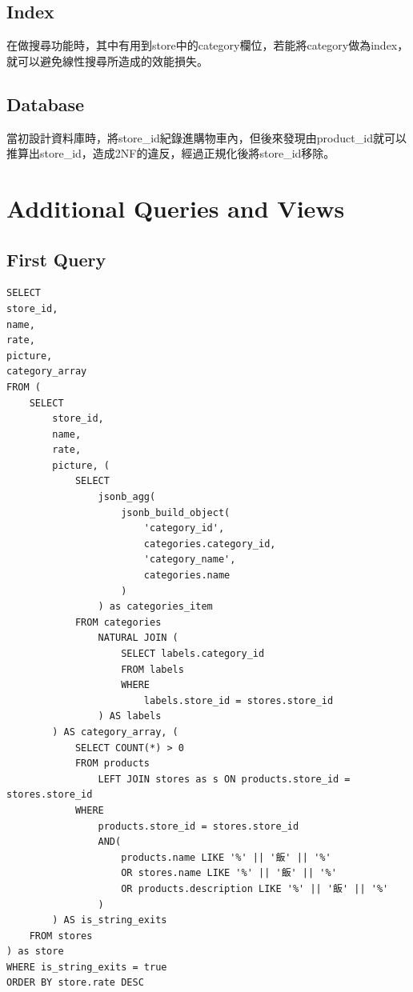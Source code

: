\documentclass[a4paper, 12pt]{article}
\begin{document}
\subsection{Index}
    在做搜尋功能時，其中有用到store中的category欄位，若能將category做為index，就可以避免線性搜尋所造成的效能損失。
\subsection{Database}
    當初設計資料庫時，將store\_id紀錄進購物車內，但後來發現由product\_id就可以推算出store\_id，造成2NF的違反，經過正規化後將store\_id移除。

\newpage

\section{Additional Queries and Views}

\subsection{First Query}

\begin{lstlisting}
SELECT
store_id,
name,
rate,
picture,
category_array
FROM (
    SELECT
        store_id,
        name,
        rate,
        picture, (
            SELECT
                jsonb_agg(
                    jsonb_build_object(
                        'category_id',
                        categories.category_id,
                        'category_name',
                        categories.name
                    )
                ) as categories_item
            FROM categories
                NATURAL JOIN (
                    SELECT labels.category_id
                    FROM labels
                    WHERE
                        labels.store_id = stores.store_id
                ) AS labels
        ) AS category_array, (
            SELECT COUNT(*) > 0
            FROM products
                LEFT JOIN stores as s ON products.store_id = stores.store_id
            WHERE
                products.store_id = stores.store_id
                AND(
                    products.name LIKE '%' || '飯' || '%'
                    OR stores.name LIKE '%' || '飯' || '%'
                    OR products.description LIKE '%' || '飯' || '%'
                )
        ) AS is_string_exits
    FROM stores
) as store
WHERE is_string_exits = true
ORDER BY store.rate DESC
\end{lstlisting}
\end{document}

